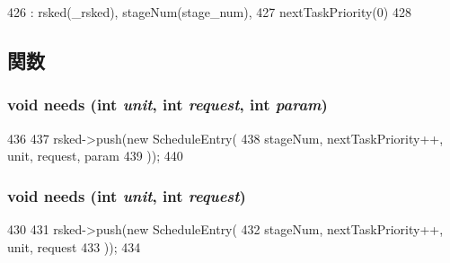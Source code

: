 \begin{DoxyCode}
426             : rsked(_rsked), stageNum(stage_num),
427               nextTaskPriority(0)
428         { }
\end{DoxyCode}


\subsection{関数}
\hypertarget{classInOrderCPU_1_1StageScheduler_a235f6065e34ca0d8b263e944ed3f30d7}{
\subsubsection[{needs}]{\setlength{\rightskip}{0pt plus 5cm}void needs (int {\em unit}, \/  int {\em request}, \/  int {\em param})}}
\label{classInOrderCPU_1_1StageScheduler_a235f6065e34ca0d8b263e944ed3f30d7}



\begin{DoxyCode}
436                                                      {
437             rsked->push(new ScheduleEntry(
438                             stageNum, nextTaskPriority++, unit, request, param
439                             ));
440         }
\end{DoxyCode}
\hypertarget{classInOrderCPU_1_1StageScheduler_abe9e2575f4a19fa0d829e7a4ceccddf5}{
\subsubsection[{needs}]{\setlength{\rightskip}{0pt plus 5cm}void needs (int {\em unit}, \/  int {\em request})}}
\label{classInOrderCPU_1_1StageScheduler_abe9e2575f4a19fa0d829e7a4ceccddf5}



\begin{DoxyCode}
430                                           {
431             rsked->push(new ScheduleEntry(
432                             stageNum, nextTaskPriority++, unit, request
433                             ));
434         }
\end{DoxyCode}


